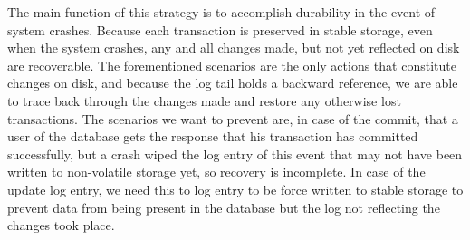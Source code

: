 The main function of this strategy is to accomplish durability in the event of
system crashes. Because each transaction is preserved in stable storage, even
when the system crashes, any and all changes made, but not yet reflected on disk
are recoverable. The forementioned scenarios are the only actions that constitute
changes on disk, and because the log tail holds a backward reference, we are
able to trace back through the changes made and restore any otherwise lost
transactions. The scenarios we want to prevent are, in case of the commit, that a user of the database gets the response that his transaction has committed successfully, but a crash wiped the log entry of this event that may not have been written to non-volatile storage yet, so recovery is incomplete. In case of the update log entry, we need this to log entry to be force written to stable storage to prevent data from being present in the database but the log not reflecting the changes took place.

\iffalse
Wiki (for discussion): "A record of the changes must still be preserved at commit time to ensure that the transaction is durable. This record is typically written to a sequential transaction log, with the actual changes to the database objects being changes which can be written at a later time.

For frequently changed objects, a no-force policy allows updates to be merged and so reduce the number of write operations to the actual database object. A no-force policy also reduces the seek time required for a commit by having mostly sequential write operations to the transaction log, rather than requiring the disk to seek to many distinct database objects during a commit."
\fi
